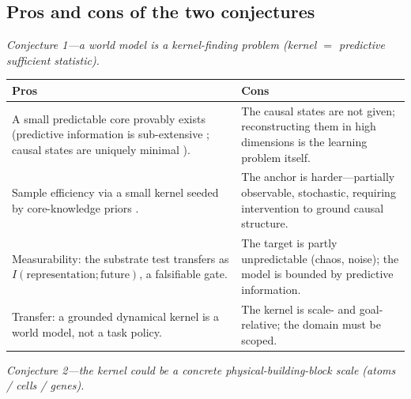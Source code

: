 \documentclass[10pt,twocolumn]{article}
\begin{document}
\subsection{Pros and cons of the two conjectures}
\label{sec:wm-proscons}

\noindent\emph{Conjecture 1---a world model is a kernel-finding problem (kernel
$=$ predictive sufficient statistic).}

\begin{center}\small
\begin{tabular}{@{}p{}p{}@{}}
\toprule
Pros & Cons\\
\midrule
A small predictable core provably exists (predictive information is sub-extensive
\citep{bialek2001predictability}; causal states are uniquely minimal
\citep{shalizi2001computational}). &
The causal states are not given; reconstructing them in high dimensions is the
learning problem itself.\\
Sample efficiency via a small kernel seeded by core-knowledge priors
\citep{spelke2007core, lake2017building}. &
The anchor is harder---partially observable, stochastic, requiring intervention to
ground causal structure.\\
Measurability: the substrate test transfers as
$I(\text{representation};\text{future})$, a falsifiable gate. &
The target is partly unpredictable (chaos, noise); the model is bounded by
predictive information.\\
Transfer: a grounded dynamical kernel is a world model, not a task policy. &
The kernel is scale- and goal-relative; the domain must be scoped.\\
\bottomrule
\end{tabular}
\end{center}

\noindent\emph{Conjecture 2---the kernel could be a concrete physical-building-block
scale (atoms / cells / genes).}
\end{document}
